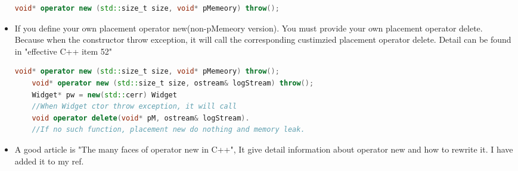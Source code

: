\documentclass[a4paper,12pt,twoside]{book}
\begin{document}
\begin{itemize}
	\begin{lstlisting}[frame=single, language=c++]
	void* operator new (std::size_t size, void* pMemeory) throw();
	\end{lstlisting}
	
	\item If you define your own placement operator new(non-pMemeory version). You must provide your own placement operator delete. Because when the constructor throw exception, it will call the corresponding custimzied placement operator delete. Detail can be found in "effective C++ item 52"
	\begin{lstlisting}[frame=single, language=c++]
	void* operator new (std::size_t size, void* pMemeory) throw();
	void* operator new (std::size_t size, ostream& logStream) throw();
	Widget* pw = new(std::cerr) Widget
	//When Widget ctor throw exception, it will call 
	void operator delete(void* pM, ostream& logStream). 
	//If no such function, placement new do nothing and memory leak.
	\end{lstlisting}
	
	\item A good article is "The many faces of operator new in C++", It give  detail information about operator new and how to rewrite it. I have added it to my ref.
\end{itemize}
\end{document}
